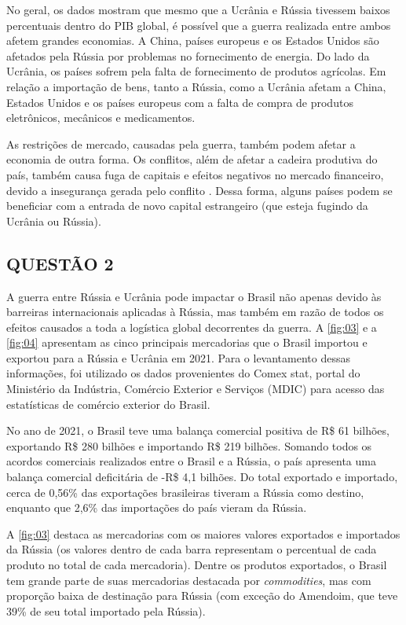 \documentclass[
article, %
12pt, %
oneside, %
a4paper, %
portuguese, %
portuguese %
]{abntex2}
\begin{document}
No geral, os dados mostram que mesmo que a Ucrânia e Rússia tivessem baixos percentuais dentro do PIB global, é possível que a guerra realizada entre ambos afetem grandes economias. A China, países europeus e os Estados Unidos são afetados pela Rússia por problemas no fornecimento de energia. Do lado da Ucrânia, os países sofrem pela falta de fornecimento de produtos agrícolas. Em relação a importação de bens, tanto a Rússia, como a Ucrânia afetam a China, Estados Unidos e os países europeus com a falta de compra de produtos eletrônicos, mecânicos e medicamentos.

As restrições de mercado, causadas pela guerra, também podem afetar a economia de outra forma. Os conflitos, além de afetar a cadeira produtiva do país, também causa fuga de capitais e efeitos negativos no mercado financeiro, devido a insegurança gerada pelo conflito \cite{schneider2006war,brune2015war}. Dessa forma, alguns países podem se beneficiar com a entrada de novo capital estrangeiro (que esteja fugindo da Ucrânia ou Rússia).




\subsection{QUESTÃO 2}

A guerra entre Rússia e Ucrânia pode impactar o Brasil não apenas devido às barreiras internacionais aplicadas à Rússia, mas também em razão de todos os efeitos causados a toda a logística global decorrentes da guerra. A \autoref{fig:03} e a \autoref{fig:04} apresentam as cinco principais mercadorias que o Brasil importou e exportou para a Rússia e Ucrânia em 2021. Para o levantamento dessas informações, foi utilizado os dados provenientes do Comex stat, portal do Ministério da Indústria, Comércio Exterior e Serviços (MDIC) para acesso das estatísticas de comércio exterior do Brasil. 

No ano de 2021, o Brasil teve uma balança comercial positiva de R\$ 61 bilhões, exportando R\$ 280 bilhões e importando R\$ 219 bilhões. Somando todos os acordos comerciais realizados entre o Brasil e a Rússia, o país apresenta uma balança comercial deficitária de -R\$ 4,1 bilhões. Do total exportado e importado, cerca de 0,56\% das exportações brasileiras tiveram a Rússia como destino, enquanto que 2,6\% das importações do país vieram da Rússia.

A \autoref{fig:03} destaca as mercadorias com os maiores valores exportados e importados da Rússia (os valores dentro de cada barra representam o percentual de cada produto no total de cada mercadoria). Dentre os produtos exportados, o Brasil tem grande parte de suas mercadorias destacada por \textit{commodities}, mas com proporção baixa de destinação para Rússia (com exceção do Amendoim, que teve 39\% de seu total importado pela Rússia).
\end{document}
